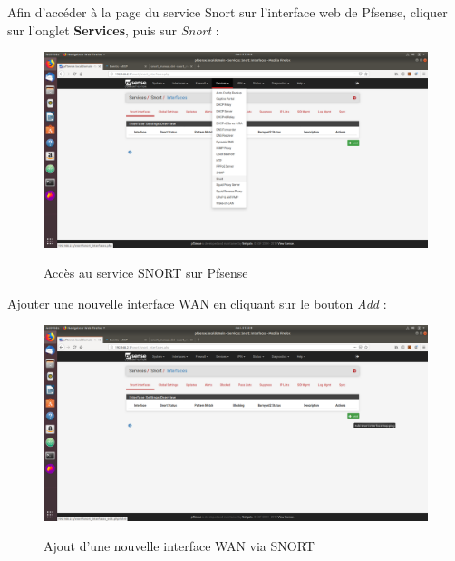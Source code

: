 Afin d'accéder à la page du service Snort sur l'interface web de Pfsense, cliquer sur l'onglet \textbf{Services}, puis sur \textit{Snort} :
\begin{figure}[h!]
    \begin{center}
        \includegraphics[scale=0.33]{MISP_Screenshots/Snort/7.png}
        \label{MISP_Screenshots/Snort/7}
        \caption{Accès au service SNORT sur Pfsense}
    \end{center}
\end{figure}
\FloatBarrier

\pagebreak

Ajouter une nouvelle interface WAN en cliquant sur le bouton \textit{Add} :
\begin{figure}[h!]
    \begin{center}
        \includegraphics[scale=0.33]{MISP_Screenshots/Snort/8.png}
        \label{MISP_Screenshots/Snort/8}
        \caption{Ajout d'une nouvelle interface WAN via SNORT}
    \end{center}
\end{figure}
\FloatBarrier 

